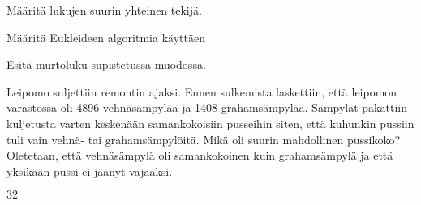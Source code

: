 

\begin{kotitehtavasivu}

\begin{tehtava}
    Määritä lukujen suurin yhteinen tekijä.
    

    \begin{vastaus}
    \end{vastaus}
    
\end{tehtava}

\begin{tehtava}
    Määritä Eukleideen algoritmia käyttäen
    

    \begin{vastaus}
    \end{vastaus}
    
\end{tehtava}

\begin{tehtava}
    Esitä murtoluku
    supistetussa muodossa.

    \begin{vastaus}
    \end{vastaus}
    
\end{tehtava}

\begin{tehtava}
    Leipomo suljettiin remontin ajaksi. Ennen sulkemista laskettiin, että leipomon varastossa oli 4896 vehnäsämpylää ja 1408 grahamsämpylää. Sämpylät pakattiin kuljetusta varten keskenään samankokoisiin pusseihin siten, että kuhunkin pussiin tuli vain vehnä- tai grahamsämpylöitä. Mikä oli suurin mahdollinen pussikoko? Oletetaan, että vehnäsämpylä oli samankokoinen kuin grahamsämpylä ja että yksikään pussi ei jäänyt vajaaksi.

    \begin{vastaus}
        $32$
    \end{vastaus}
    

\end{tehtava}
\end{kotitehtavasivu}
